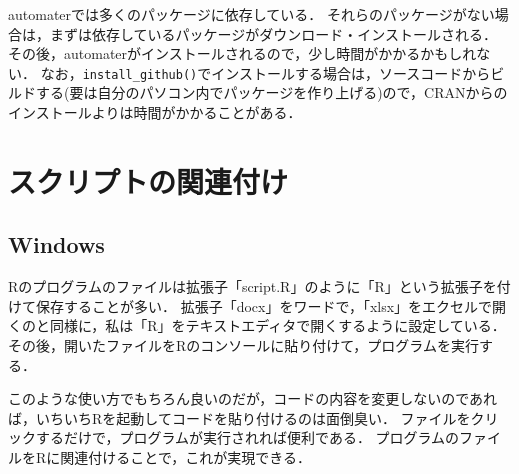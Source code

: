 \documentclass[
]{article}
\begin{document}
automaterでは多くのパッケージに依存している．
それらのパッケージがない場合は，まずは依存しているパッケージがダウンロード・インストールされる．
その後，automaterがインストールされるので，少し時間がかかるかもしれない．
なお，\texttt{install\_github()}でインストールする場合は，ソースコードからビルドする(要は自分のパソコン内でパッケージを作り上げる)ので，CRANからのインストールよりは時間がかかることがある．

\hypertarget{assoc}{%
\section{スクリプトの関連付け}\label{assoc}}

\hypertarget{windows}{%
\subsection{Windows}\label{windows}}

Rのプログラムのファイルは拡張子「script.R」のように「R」という拡張子を付けて保存することが多い．
拡張子「docx」をワードで，「xlsx」をエクセルで開くのと同様に，私は「R」をテキストエディタで開くするように設定している．
その後，開いたファイルをRのコンソールに貼り付けて，プログラムを実行する．

このような使い方でもちろん良いのだが，コードの内容を変更しないのであれば，いちいちRを起動してコードを貼り付けるのは面倒臭い．
ファイルをクリックするだけで，プログラムが実行されれば便利である．
プログラムのファイルをRに関連付けることで，これが実現できる．
\end{document}
